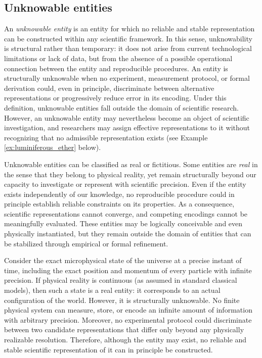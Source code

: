 \subsection*{Unknowable entities}

An \emph{unknowable entity} is an entity for which no reliable and stable representation can be constructed within any scientific framework. In this sense, unknowability is structural rather than temporary: it does not arise from current technological limitations or lack of data, but from the absence of a possible operational connection between the entity and reproducible procedures. An entity is structurally unknowable when no experiment, measurement protocol, or formal derivation could, even in principle, discriminate between alternative representations or progressively reduce error in its encoding. Under this definition, unknowable entities fall outside the domain of scientific research. However, an unknowable entity may nevertheless become an object of scientific investigation, and researchers may assign effective representations to it without recognizing that no admissible representation exists (see Example \ref{ex:luminiferous_ether} below).

Unknowable entities can be classified as real or fictitious. Some entities are \emph{real} in the sense that they belong to physical reality, yet remain structurally beyond our capacity to investigate or represent with scientific precision. Even if the entity exists independently of our knowledge, no reproducible procedure could in principle establish reliable constraints on its properties. As a consequence, scientific representations cannot converge, and competing encodings cannot be meaningfully evaluated. These entities may be logically conceivable and even physically instantiated, but they remain outside the domain of entities that can be stabilized through empirical or formal refinement.

\begin{example}
Consider the exact microphysical state of the universe at a precise instant of time, including the exact position and momentum of every particle with infinite precision. If physical reality is continuous (as assumed in standard classical models), then such a state is a real entity: it corresponds to an actual configuration of the world. However, it is structurally unknowable. No finite physical system can measure, store, or encode an infinite amount of information with arbitrary precision. Moreover, no experimental protocol could discriminate between two candidate representations that differ only beyond any physically realizable resolution. Therefore, although the entity may exist, no reliable and stable scientific representation of it can in principle be constructed. 
\end{example}

